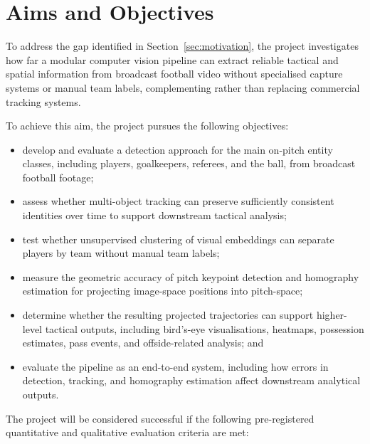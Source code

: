 \section{Aims and Objectives}
\label{sec:aims}

To address the gap identified in Section~\ref{sec:motivation}, the project
investigates how far a modular computer vision pipeline can extract
reliable tactical and spatial information from broadcast football video
without specialised capture systems or manual team labels, complementing
rather than replacing commercial tracking systems.

To achieve this aim, the project pursues the following objectives:

\begin{itemize}
    \item develop and evaluate a detection approach for the main on-pitch entity classes, including players, goalkeepers, referees, and the ball, from broadcast football footage;
    
    \item assess whether multi-object tracking can preserve sufficiently consistent identities over time to support downstream tactical analysis;
    
    \item test whether unsupervised clustering of visual embeddings can separate players by team without manual team labels;
    
    \item measure the geometric accuracy of pitch keypoint detection and homography estimation for projecting image-space positions into pitch-space;
    
    \item determine whether the resulting projected trajectories can support higher-level tactical outputs, including bird's-eye visualisations, heatmaps, possession estimates, pass events, and offside-related analysis; and
    
    \item evaluate the pipeline as an end-to-end system, including how errors in detection, tracking, and homography estimation affect downstream analytical outputs.
\end{itemize}

The project will be considered successful if the following pre-registered quantitative and qualitative
evaluation criteria are met:

